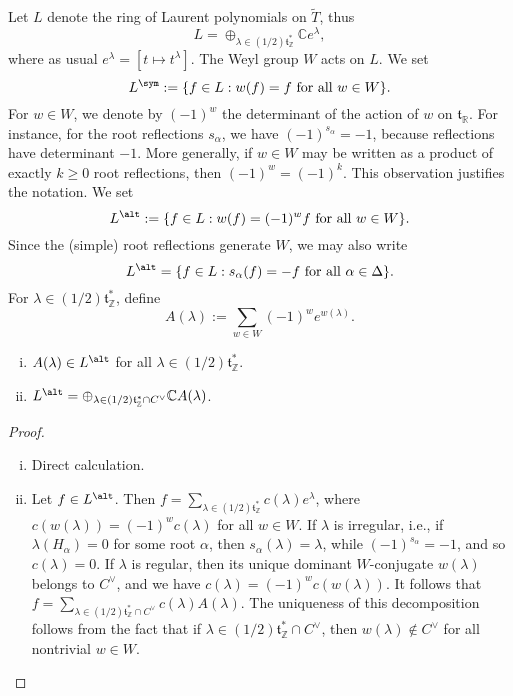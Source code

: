 \documentclass[reqno]{amsart} 
\begin{document}
Let $L$ denote the ring of Laurent polynomials on $\tilde{T}$, thus
\begin{equation*}
  L = \oplus_{\lambda \in (1/2) \mathfrak{t}_{\mathbb{Z}}^*} \mathbb{C} e^{\lambda},
\end{equation*}
where as usual $e^\lambda = [t \mapsto t^{\lambda}]$.  The Weyl group $W$ acts on $L$.  We set
\begin{equation*}
  L^{\sym} := \{f \in L : w(f) = f \text{ for all } w \in W\}.
\end{equation*}
For $w \in W$, we denote by $(-1)^w$ the determinant of the action of $w$ on $\mathfrak{t}_{\mathbb{R}}$.  For instance, for the root reflections $s_\alpha$, we have $(-1)^{s_\alpha} = -1$, because reflections have determinant $-1$.  More generally, if $w \in W$ may be written as a product of exactly $k \geq 0$ root reflections, then $(-1)^w = (-1)^k$.  This observation justifies the notation.  We set
\begin{equation*}
  L^{\alt} := \{f \in L : w(f) = (-1)^w f \text{ for all } w \in W\}.
\end{equation*}
Since the (simple) root reflections generate $W$, we may also write
\begin{equation*}
  L^{\alt} = \{f \in L : s_\alpha(f) = - f \text{ for all } \alpha \in \Delta\}.
\end{equation*}
For $\lambda \in (1/2) \mathfrak{t}_{\mathbb{Z}}^*$, define
\begin{equation*}
  A(\lambda)
  :=
  \sum_{w \in W}
  (-1)^w
  e^{w(\lambda)}.
\end{equation*}
\begin{lemma}
  \begin{enumerate}
[(i)]
  \item $A(\lambda) \in L^{\alt}$ for all $\lambda \in (1/2) \mathfrak{t}_{\mathbb{Z}}^*$.
  \item $L^{\alt} = \oplus_{\lambda \in (1/2) \mathfrak{t}_{\mathbb{Z}}^* \cap C^\vee} \mathbb{C} A(\lambda)$.
  \end{enumerate}
\end{lemma}
\begin{proof}
  \begin{enumerate}
[(i)]
  \item Direct calculation.
  \item Let $f \in L^{\alt}$.  Then $f = \sum_{\lambda \in (1/2) \mathfrak{t}_{\mathbb{Z}}^*} c(\lambda) e^{\lambda}$, where $c(w(\lambda)) = (-1)^w c(\lambda)$ for all $w \in W$.  If $\lambda$ is irregular, i.e., if $\lambda(H_\alpha) = 0$ for some root $\alpha$, then $s_\alpha(\lambda) = \lambda$, while $(-1)^{s_\alpha} = -1$, and so $c(\lambda) = 0$.  If $\lambda$ is regular, then its unique dominant $W$-conjugate $w(\lambda)$ belongs to $C^\vee$, and we have $c(\lambda) = (-1)^w c(w(\lambda))$.  It follows that $f = \sum_{\lambda \in (1/2) \mathfrak{t}_{\mathbb{Z}}^* \cap C^\vee} c(\lambda) A(\lambda)$.  The uniqueness of this decomposition follows from the fact that if $\lambda \in (1/2) \mathfrak{t}_{\mathbb{Z}}^* \cap C^\vee$, then $w(\lambda) \notin C^\vee$ for all nontrivial $w \in W$.
  \end{enumerate}
\end{proof}
\end{document}
